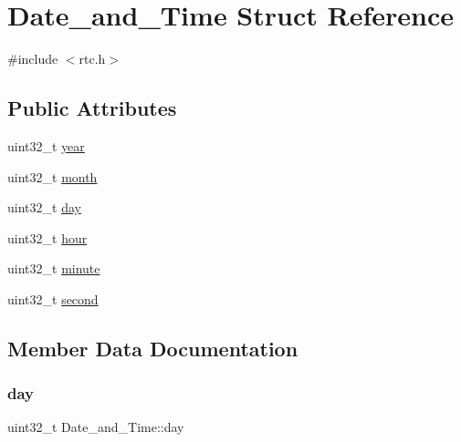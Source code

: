 \hypertarget{struct_date__and___time}{}\section{Date\+\_\+and\+\_\+\+Time Struct Reference}
\label{struct_date__and___time}


{\ttfamily \#include $<$rtc.\+h$>$}

\subsection*{Public Attributes}
\begin{DoxyCompactItemize}
\item 
uint32\+\_\+t \mbox{\hyperlink{struct_date__and___time_ade104bcb05e7817e04904bee37fc1acb}{year}}
\item 
uint32\+\_\+t \mbox{\hyperlink{struct_date__and___time_a7c3abab3a768559d283075753cfa822c}{month}}
\item 
uint32\+\_\+t \mbox{\hyperlink{struct_date__and___time_a83e892ad2d13f55818bab022239dbb4a}{day}}
\item 
uint32\+\_\+t \mbox{\hyperlink{struct_date__and___time_adaadd3d3ede5d302aa1c29db9a8d3a2e}{hour}}
\item 
uint32\+\_\+t \mbox{\hyperlink{struct_date__and___time_a748e5a8772cc82138e56fd54fd4ae7a8}{minute}}
\item 
uint32\+\_\+t \mbox{\hyperlink{struct_date__and___time_aed8b75bcb223dd5828a2b8ed0b5c9eec}{second}}
\end{DoxyCompactItemize}


\subsection{Member Data Documentation}
\mbox{\label{struct_date__and___time_a83e892ad2d13f55818bab022239dbb4a}} 
\subsubsection{\texorpdfstring{day}{day}}
{\footnotesize\ttfamily uint32\+\_\+t Date\+\_\+and\+\_\+\+Time\+::day}

\mbox{\label{struct_date__and___time_adaadd3d3ede5d302aa1c29db9a8d3a2e}} 
